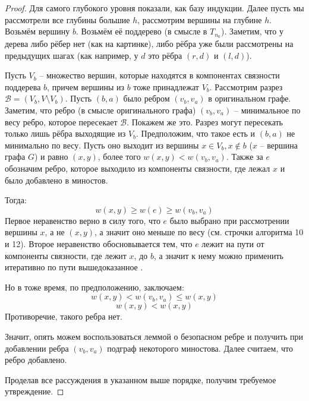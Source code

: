 \begin{proof}
        Для самого глубокого уровня показали, как базу индукции. Далее пусть мы рассмотрели все глубины большие $h$, рассмотрим вершины на глубине $h$.
        Возьмём вершину $b$. Возьмём её поддерево (в смысле в $T_{n_0}$). Заметим, что у дерева либо рёбер нет (как на картинке), либо рёбра уже были рассмотрены на предыдущих шагах (как например, у $d$ это рёбра $(r, d)$ и $(l, d)$).

        Пусть $V_b$ -- множество вершин, которые находятся в компонентах связности поддерева $b$, причем вершины из $b$ тоже принадлежат $V_b$. Рассмотрим разрез $\mathcal{B} = (V_b, V \setminus V_b)$. 
        Пусть $(b, a)$ было ребром $(v_b, v_a)$ в оригинальном графе.
        Заметим, что ребро (в смысле оригинального графа) $(v_b, v_a)$ -- минимальное по весу ребро, которое пересекает $\mathcal{B}$.
        Покажем же это. Разрез могут пересекать только лишь рёбра выходящие из $V_b$.
        Предположим, что такое есть и $(b, a)$ не минимально по весу. Пусть оно выходит из вершины $x \in V_b, x \not\in b$ ($x$ -- вершина графа $G$) и равно $(x, y)$, более того $w(x, y) < w(v_b, v_a)$. Также за $e$ обозначим ребро, которое выходило из компоненты связности, где лежал $x$ и было добавлено в миностов.

        Тогда:
        \begin{equation*}
            w(x, y) \geq w(e) \geq w(v_b, v_a)
        \end{equation*}
        Первое неравенство верно в силу того, что $e$ было выбрано при рассмотрении вершины $x$, а не $(x, y)$, а значит оно меньше по весу (см. строчки алгоритма 10 и 12). Второе неравенство обосновывается тем, что $e$ лежит на пути от компоненты связности, где лежит $x$, до $b$, а значит к нему можно применить итеративно по пути вышедоказанное .

        Но в тоже время, по предположению, заключаем:
        \begin{equation*}
            w(x, y) < w(v_b, v_a) \leq w(x, y)
        \end{equation*}
        \begin{equation*}
            w(x, y) < w(x, y)
        \end{equation*}
        Противоречие, такого ребра нет.

        Значит, опять можем воспользоваться леммой о безопасном ребре и получить при добавлении ребра $(v_b, v_a)$ подграф некоторого миностова. Далее считаем, что ребро добавлено.

        Проделав все рассуждения в указанном выше порядке, получим требуемое утвреждение.

\end{proof}
